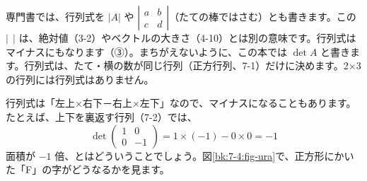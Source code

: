 \begin{seikaku}
専門書では、行列式を $|A|$ や $\left|\begin{smallmatrix}a&b\\c&d\end{smallmatrix}\right|$（たての棒ではさむ）とも書きます。この $|\ \ |$ は、絶対値（3-2）やベクトルの大きさ（4-10）とは別の意味です。行列式はマイナスにもなります（③）。まちがえないように、この本では $\det A$ と書きます。行列式は、たて・横の数が同じ行列（正方行列、7-1）だけに決めます。2×3 の行列には行列式はありません。
\end{seikaku}


\leavevmode\label{bk:7-4:fugou}行列式は「左上×右下－右上×左下」なので、マイナスになることもあります。たとえば、上下を裏返す行列（7-2）では、
\[ \det\begin{pmatrix}1&0\\0&-1\end{pmatrix}=1\times(-1)-0\times0=-1 \]
面積が $-1$ 倍、とはどういうことでしょう。図\ref{bk:7-4:fig-ura}で、正方形にかいた「F」の字がどうなるかを見ます。
